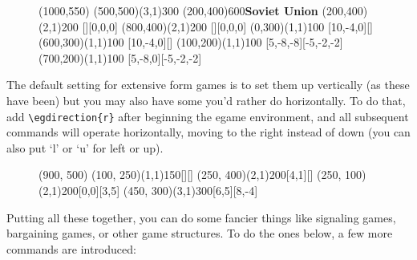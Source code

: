 \documentclass{article}
\begin{document}
\begin{figure}[h]
\begin{footnotesize}
\begin{center}
\begin{egame}(1000,550)
\putbranch(500,500)(3,1){300} 
\infoset(200,400){600}{\textbf{Soviet Union}}
\putbranch(200,400)(2,1){200} [][0,0,0]
\putbranch(800,400)(2,1){200} [][0,0,0]
\putbranch(0,300)(1,1){100} [10,-4,0][]
\putbranch(600,300)(1,1){100} [10,-4,0][]
\putbranch(100,200)(1,1){100} [5,-8,-8][-5,-2,-2]
\putbranch(700,200)(1,1){100} [5,-8,0][-5,-2,-2]
\end{egame}
\end{center}
\end{footnotesize}
\end{figure}

\vspace{-.5cm}

The default setting for extensive form games is to set them up vertically (as these have been) but you may also have some you'd rather do horizontally.  To do that, add \verb+\egdirection{r}+ after beginning the egame environment, and all subsequent commands will operate horizontally, moving to the right instead of down (you can also put `l' or `u' for left or up).

\begin{figure}[h]
\begin{footnotesize}
\begin{center}
\begin{egame}(900, 500)
\putbranch(100, 250)(1,1){150}[][]
\putbranch(250, 400)(2,1){200}[4,1][]
\putbranch(250, 100)(2,1){200}[0,0][3,5]
\putbranch(450, 300)(3,1){300}[6,5][8,-4]
\end{egame}
\end{center}
\end{footnotesize}
\end{figure}

\clearpage

Putting all these together, you can do some fancier things like signaling games, bargaining games, or other game structures.  To do the ones below, a few more commands are introduced: \\
\end{document}
